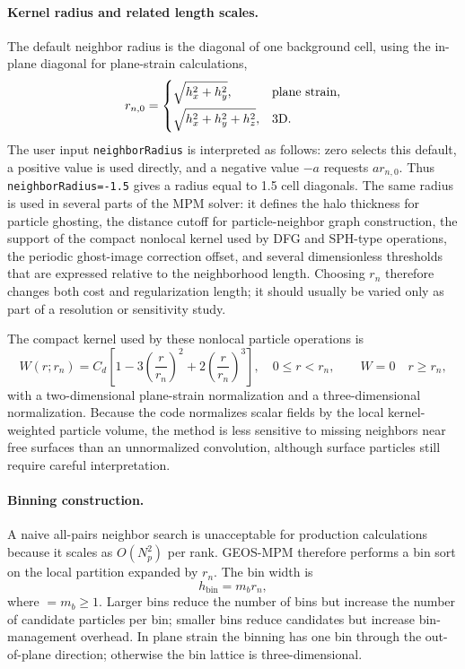 \paragraph{Kernel radius and related length scales.}
The default neighbor radius is the diagonal of one background cell, using the in-plane diagonal for plane-strain calculations,
\begin{equation}
  r_{n,0}=\begin{cases}
    \sqrt{h_x^2+h_y^2}, & \hbox{plane strain},\\[2mm]
    \sqrt{h_x^2+h_y^2+h_z^2}, & \hbox{3D}.
  \end{cases}
\end{equation}
The user input \texttt{neighborRadius} is interpreted as follows: zero selects this default, a positive value is used directly, and a negative value $-a$ requests $a r_{n,0}$.  Thus \texttt{neighborRadius=-1.5} gives a radius equal to 1.5 cell diagonals.  The same radius is used in several parts of the MPM solver: it defines the halo thickness for particle ghosting, the distance cutoff for particle-neighbor graph construction, the support of the compact nonlocal kernel used by DFG and SPH-type operations, the periodic ghost-image correction offset, and several dimensionless thresholds that are expressed relative to the neighborhood length.  Choosing $r_n$ therefore changes both cost and regularization length; it should usually be varied only as part of a resolution or sensitivity study.

The compact kernel used by these nonlocal particle operations is
\begin{equation}
  W(r;r_n)=C_d\left[1-3\left(\frac{r}{r_n}\right)^2+2\left(\frac{r}{r_n}\right)^3\right],\quad 0\le r<r_n,
  \qquad W=0\quad r\ge r_n,
\end{equation}
with a two-dimensional plane-strain normalization and a three-dimensional normalization.  Because the code normalizes scalar fields by the local kernel-weighted particle volume, the method is less sensitive to missing neighbors near free surfaces than an unnormalized convolution, although surface particles still require careful interpretation.

\paragraph{Binning construction.}
A naive all-pairs neighbor search is unacceptable for production calculations because it scales as $O(N_p^2)$ per rank.  GEOS-MPM therefore performs a bin sort on the local partition expanded by $r_n$.  The bin width is
\begin{equation}
  h_{\mathrm{bin}}=m_b r_n,
\end{equation}
where  $=m_b\ge 1$.  Larger bins reduce the number of bins but increase the number of candidate particles per bin; smaller bins reduce candidates but increase bin-management overhead.  In plane strain the binning has one bin through the out-of-plane direction; otherwise the bin lattice is three-dimensional.


